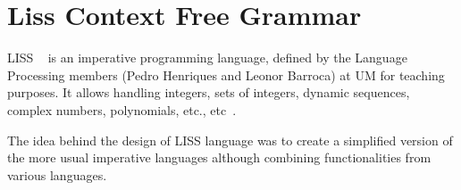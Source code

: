 \documentclass[
  oneside,
  11pt, a4paper,
  footinclude=true,
  headinclude=true,
  cleardoublepage=empty
]{scrbook}
\begin{document}


	

	
	
	
	\chapter{Liss Context Free Grammar}

	LISS ~\citep{CH07a} is an imperative programming language, defined by the Language Processing members (Pedro Henriques and Leonor Barroca) at UM for teaching purposes.
	It allows handling integers, sets of integers, dynamic sequences, complex numbers, polynomials, etc., etc~\citep{CH07d,CH07a,CH06a,CH06b,CH05a}.

	The idea behind the design of LISS language was to create a simplified version of the more usual imperative languages although combining functionalities from various languages.

	
	



\end{document}
